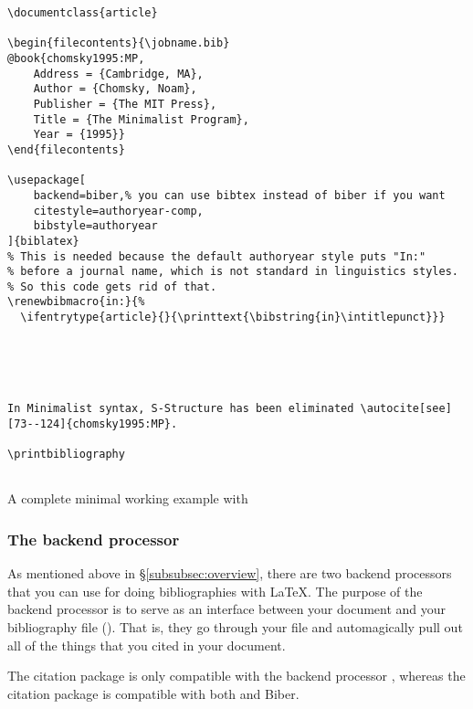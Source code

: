 \begin{listing}[htbp]
	\centering
	\begin{verbatim}
\documentclass{article}

\begin{filecontents}{\jobname.bib}
@book{chomsky1995:MP,
    Address = {Cambridge, MA},
    Author = {Chomsky, Noam},
    Publisher = {The MIT Press},
    Title = {The Minimalist Program},
    Year = {1995}}
\end{filecontents}

\usepackage[
    backend=biber,% you can use bibtex instead of biber if you want
    citestyle=authoryear-comp,
    bibstyle=authoryear
]{biblatex}
% This is needed because the default authoryear style puts "In:" 
% before a journal name, which is not standard in linguistics styles.
% So this code gets rid of that.
\renewbibmacro{in:}{%
  \ifentrytype{article}{}{\printtext{\bibstring{in}\intitlepunct}}}





In Minimalist syntax, S-Structure has been eliminated \autocite[see][73--124]{chomsky1995:MP}.

\printbibliography


	\end{verbatim}
	\caption{A complete minimal working example with }
	\label{lst:biblatex-example}
\end{listing}

\subsubsection{The backend processor}
\label{subsubsec:the-backend-processor}

As mentioned above in \S\ref{subsubsec:overview}, there are two backend processors that you can use for doing bibliographies with \LaTeX.
The purpose of the backend processor is to serve as an interface between your  document and your bibliography file ().
That is, they go through your  file and automagically pull out all of the things that you cited in your  document.

The citation package  is only compatible with the backend processor , whereas the citation package  is compatible with both  and Biber.

\label{subsubsubsec:bibtex}

